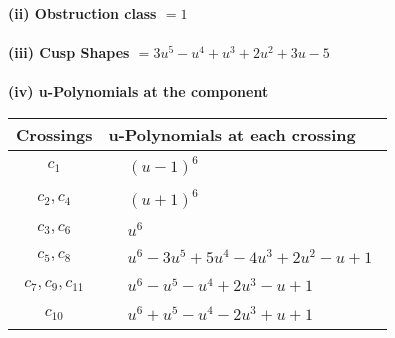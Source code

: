 \documentclass[1p]{elsarticle_modified}
\theoremstyle{definition}
\begin{document}
\flushleft \textbf{(ii) Obstruction class $= 1$}\\~\\
\flushleft \textbf{(iii) Cusp Shapes $= 3 u^5- u^4+u^3+2 u^2+3 u-5$}\\~\\
\newpage\renewcommand{\arraystretch}{1}
\flushleft \textbf{(iv) u-Polynomials at the component}\newline \\
\begin{tabular}{m{50pt}|m{274pt}}
Crossings & \hspace{64pt}u-Polynomials at each crossing \\
\hline $$\begin{aligned}c_{1}\end{aligned}$$&$\begin{aligned}
&(u-1)^6
\end{aligned}$\\
\hline $$\begin{aligned}c_{2},c_{4}\end{aligned}$$&$\begin{aligned}
&(u+1)^6
\end{aligned}$\\
\hline $$\begin{aligned}c_{3},c_{6}\end{aligned}$$&$\begin{aligned}
&u^6
\end{aligned}$\\
\hline $$\begin{aligned}c_{5},c_{8}\end{aligned}$$&$\begin{aligned}
&u^6-3 u^5+5 u^4-4 u^3+2 u^2- u+1
\end{aligned}$\\
\hline $$\begin{aligned}c_{7},c_{9},c_{11}\end{aligned}$$&$\begin{aligned}
&u^6- u^5- u^4+2 u^3- u+1
\end{aligned}$\\
\hline $$\begin{aligned}c_{10}\end{aligned}$$&$\begin{aligned}
&u^6+u^5- u^4-2 u^3+u+1
\end{aligned}$\\
\hline
\end{tabular}\\~\\
\end{document}
